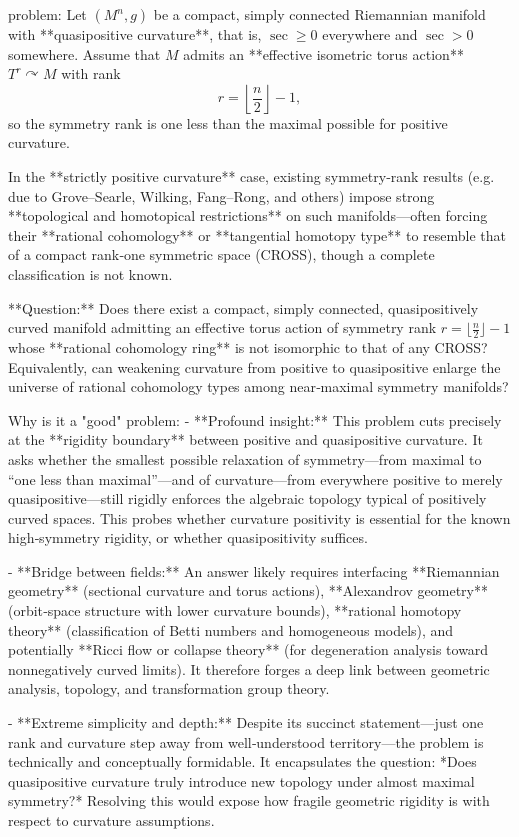 problem:  
Let \( (M^n,g) \) be a compact, simply connected Riemannian manifold with **quasipositive curvature**, that is, \(\sec \ge 0\) everywhere and \(\sec >0\) somewhere. Assume that \(M\) admits an **effective isometric torus action** \(T^r \curvearrowright M\) with rank  
\[
r = \left\lfloor \frac{n}{2} \right\rfloor - 1,
\]
so the symmetry rank is one less than the maximal possible for positive curvature.  

In the **strictly positive curvature** case, existing symmetry‑rank results (e.g. due to Grove–Searle, Wilking, Fang–Rong, and others) impose strong **topological and homotopical restrictions** on such manifolds—often forcing their **rational cohomology** or **tangential homotopy type** to resemble that of a compact rank‑one symmetric space (CROSS), though a complete classification is not known.  

**Question:**  
Does there exist a compact, simply connected, quasipositively curved manifold admitting an effective torus action of symmetry rank \( r = \lfloor \tfrac{n}{2} \rfloor - 1 \) whose **rational cohomology ring** is not isomorphic to that of any CROSS?  
Equivalently, can weakening curvature from positive to quasipositive enlarge the universe of rational cohomology types among near‑maximal symmetry manifolds?  

Why is it a "good" problem:  
- **Profound insight:**  
  This problem cuts precisely at the **rigidity boundary** between positive and quasipositive curvature. It asks whether the smallest possible relaxation of symmetry—from maximal to “one less than maximal”—and of curvature—from everywhere positive to merely quasipositive—still rigidly enforces the algebraic topology typical of positively curved spaces. This probes whether curvature positivity is essential for the known high‑symmetry rigidity, or whether quasipositivity suffices.  

- **Bridge between fields:**  
  An answer likely requires interfacing **Riemannian geometry** (sectional curvature and torus actions), **Alexandrov geometry** (orbit‑space structure with lower curvature bounds), **rational homotopy theory** (classification of Betti numbers and homogeneous models), and potentially **Ricci flow or collapse theory** (for degeneration analysis toward nonnegatively curved limits). It therefore forges a deep link between geometric analysis, topology, and transformation group theory.  

- **Extreme simplicity and depth:**  
  Despite its succinct statement—just one rank and curvature step away from well‑understood territory—the problem is technically and conceptually formidable. It encapsulates the question: *Does quasipositive curvature truly introduce new topology under almost maximal symmetry?* Resolving this would expose how fragile geometric rigidity is with respect to curvature assumptions.  

